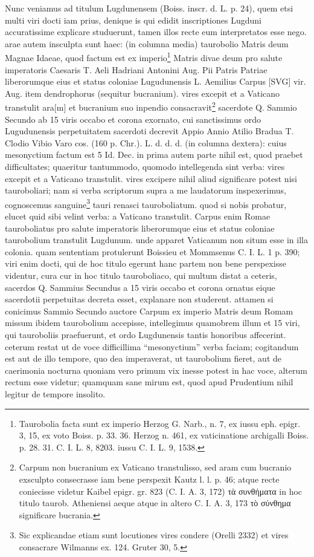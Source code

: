 \documentclass[a4paper, 11pt, oneside, polutonikogreek, german]{article}
\begin{document}
Nunc veniamus ad titulum Lugdunensem (Boiss. inscr. d. L. p. 24), quem etsi multi viri docti iam prius, denique is qui edidit inscriptiones Lugduni accuratissime explicare studuerunt, tamen illos recte eum interpretatos esse nego. arae autem insculpta sunt haec: (in columna media) taurobolio Matris deum Magnae Idaeae, quod factum est ex imperio\footnote{Taurobolia facta sunt ex imperio Herzog G. Narb., n. 7, ex iussu eph. epigr. 3, 15, ex voto Boiss. p. 33. 36. Herzog n. 461, ex vaticinatione archigalli Boiss. p. 28. 31. C. I. L. 8, 8203. iussu C. I. L. 9, 1538.} Matris divae deum pro salute imperatoris Caesaris T. Aeli Hadriani Antonini Aug. Pii Patris Patriae liberorumque eius et status coloniae Lugudunensis L. Aemilius Carpus [SVG] vir. Aug. item dendrophorus (sequitur bucranium). vires excepit et a Vaticano transtulit ara[m] et bucranium suo inpendio consacravit\footnote{Carpum non bucranium ex Vaticano transtulisso, sed aram cum bucranio exsculpto consecrasse iam bene perspexit Kautz l. l. p. 46; atque recte coniecisse videtur Kaibel epigr. gr. 823 (C. I. A. 3, 172) τὰ συνθήματα in hoc titulo taurob. Atheniensi aeque atque in altero C. I. A. 3, 173 τὸ σύνθημα significare bucrania.} sacerdote Q. Sammio Secundo ab 15 viris occabo et corona exornato, cui sanctissimus ordo Lugudunensis perpetuitatem sacerdoti decrevit Appio Annio Atilio Bradua T. Clodio Vibio Varo cos. (160 p. Chr.). L. d. d. d. (in columna dextera): cuius mesonyctium factum est 5 Id. Dec. in prima autem parte nihil est, quod praebet difficultates; quaeritur tantummodo, quomodo intellegenda sint verba: vires excepit et a Vaticano transtulit. vires excipere nihil aliud significare potest nisi tauroboliari; nam si verba scriptorum supra a me laudatorum inspexerimus, cognoscemus sanguine\footnote{Sic explicandae etiam sunt locutiones vires condere (Orelli 2332) et vires consacrare Wilmanns ex. 124. Gruter 30, 5.} tauri renasci tauroboliatum. quod si nobis probatur, elucet quid sibi velint verba: a Vaticano transtulit. Carpus enim Romae tauroboliatus pro salute imperatoris liberorumque eius et status coloniae taurobolium transtulit Lugdunum. unde apparet Vaticanum non situm esse in illa colonia. quam sententiam protulerunt Boissieu et Mommsenus C. I. L. 1 p. 390; viri enim docti, qui de hoc titulo egerunt hanc partem non bene perspexisse videntur, cura cur in hoc titulo tauroboliaco, qui multum distat a ceteris, sacerdos Q. Sammius Secundus a 15 viris occabo et corona ornatus eique sacerdotii perpetuitas decreta esset, explanare non studerent. attamen si conicimus Sammio Secundo auctore Carpum ex imperio Matris deum Romam missum ibidem taurobolium accepisse, intellegimus quamobrem illum et 15 viri, qui tauroboliis praefuerunt, et ordo Lugdunensis tantis honoribus affecerint. ceterum restat ut de voce difficillima "`mesonyctium"' verba faciam; cogitandum est aut de illo tempore, quo dea imperaverat, ut taurobolium fieret, aut de caerimonia nocturna quoniam vero primum vix inesse potest in hac voce, alterum rectum esse videtur; quamquam sane mirum est, quod apud Prudentium nihil legitur de tempore insolito.
\end{document}
